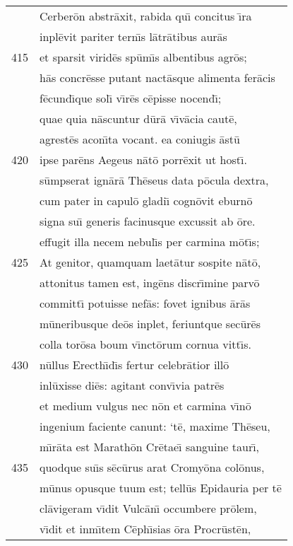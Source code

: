 \documentclass[paper=6in:9in,pagesize=pdftex,
               headinclude=on,footinclude=on,12pt]{scrbook}
\begin{document}
\begin{longtable}[p]{ r l }
 & Cerber\=on abstr\=axit, rabida qu\={\i} concitus \={\i}ra\\ 
 & inpl\=evit pariter tern\={\i}s l\=atr\=atibus aur\=as\\ 
415 & et sparsit virid\=es sp\=um\={\i}s albentibus agr\=os;\\ 
 & h\=as concr\=esse putant nact\=asque alimenta fer\=acis\\ 
 & f\=ecund\={\i}que sol\={\i} v\={\i}r\=es c\=episse nocend\={\i};\\ 
 & quae quia n\=ascuntur d\=ur\=a v\={\i}v\=acia caut\=e,\\ 
 & agrest\=es acon\={\i}ta vocant. ea coniugis \=ast\=u\\ 
420 & ipse par\=ens Aegeus n\=at\=o porr\=exit ut host\={\i}.\\ 
 & s\=umpserat ign\=ar\=a Th\=eseus data p\=ocula dextra,\\ 
 & cum pater in capul\=o gladi\={\i} cogn\=ovit eburn\=o\\ 
 & signa su\={\i} generis facinusque excussit ab \=ore.\\ 
 & effugit illa necem nebul\={\i}s per carmina m\=ot\={\i}s;\\ 
425 & \indent At genitor, quamquam laet\=atur sospite n\=at\=o,\\ 
 & attonitus tamen est, ing\=ens discr\={\i}mine parv\=o\\ 
 & committ\={\i} potuisse nef\=as: fovet ignibus \=ar\=as\\ 
 & m\=uneribusque de\=os inplet, feriuntque sec\=ur\=es\\ 
 & colla tor\=osa boum v\={\i}nct\=orum cornua vitt\={\i}s.\\ 
430 & n\=ullus Erecth\={\i}d\={\i}s fertur celebr\=atior ill\=o\\ 
 & inl\=uxisse di\=es: agitant conv\={\i}via patr\=es\\ 
 & et medium vulgus nec n\=on et carmina v\={\i}n\=o\\ 
 & ingenium faciente canunt: `t\=e, maxime Th\=eseu,\\ 
 & m\={\i}r\=ata est Marath\=on Cr\=etae\={\i} sanguine taur\={\i},\\ 
435 & quodque su\={\i}s s\=ec\=urus arat Cromy\=ona col\=onus,\\ 
 & m\=unus opusque tuum est; tell\=us Epidauria per t\=e\\ 
 & cl\=avigeram v\={\i}dit Vulc\=an\={\i} occumbere pr\=olem,\\ 
 & v\={\i}dit et inm\={\i}tem C\=eph\={\i}sias \=ora Procr\=ust\=en,\\ 

\end{longtable}
\end{document}
